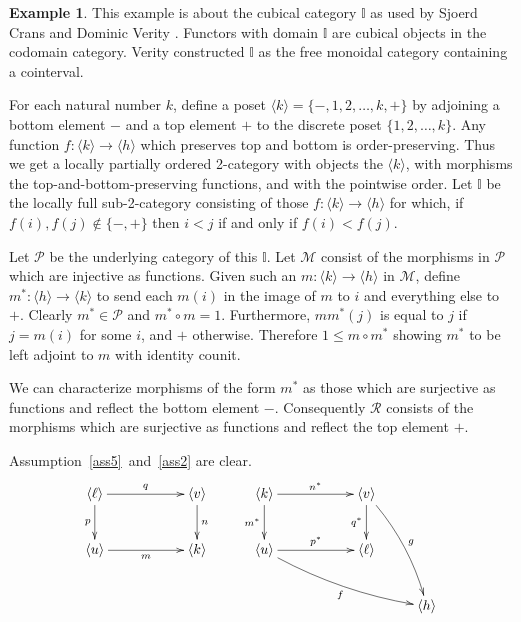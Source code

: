\documentclass[a4paper,12pt,reqno]{amsart}
\theoremstyle{definition}
\newtheorem{example}[theorem]{Example}
\theoremstyle{fact}
\theoremstyle{genquest}
\theoremstyle{step}
\newcommand{\dd}{\colon}
\newcommand{\ra}{\rightarrow}
\def\CM{{\mathscr M}}
\def\CP{{\mathscr P}}
\def\CR{{\mathscr R}}
\begin{document}
\begin{example}\label{Ex3+} This example is about the cubical category $\mathbb{I}$ as used by Sjoerd Crans \cite{CransThesis} and Dominic Verity \cite{LDTHOC, Verity07}. 
Functors with domain $\mathbb{I}$ are cubical objects in the codomain category. 
Verity constructed $\mathbb{I}$ as the free monoidal category containing a cointerval.

For each natural number $k$, define a poset $\langle k\rangle = \{-,1,2,\dots ,k,+\}$ 
by adjoining a bottom element $-$ and a top element $+$ to the discrete poset $\{1,2,\dots ,k\}$.
Any function $f \dd \langle k\rangle \ra \langle h\rangle$ which preserves top and bottom is order-preserving.
Thus we get a locally partially ordered 2-category with objects the $\langle k\rangle$, 
with morphisms the top-and-bottom-preserving functions, and with the pointwise order. 
Let $\mathbb{I}$ be the locally full sub-2-category
consisting of those $f\dd \langle k\rangle \ra \langle h\rangle$ for which,
if $f(i),f(j)\notin \{-,+\}$ then $i<j$ if and only if $f(i)<f(j)$. 

Let $\CP$ be the underlying category of this $\mathbb{I}$.
Let $\CM$ consist of the morphisms in $\CP$ which are injective as functions. 
Given such an $m \dd \langle k\rangle \ra \langle h\rangle$ in $\CM$,
define $m^* : \langle h\rangle \ra \langle k\rangle$ to send each $m(i)$
in the image of $m$ to $i$ and everything else to $+$. 
Clearly $m^*\in \CP$ and $m^*\circ m = 1$.
Furthermore, $mm^*(j)$ is equal to $j$ if $j=m(i)$ for some $i$, and $+$ otherwise.
Therefore $1\le m\circ m^*$ showing $m^*$ to be left adjoint to $m$
with identity counit.

We can characterize morphisms of the form $m^*$ as those which are surjective as functions and reflect the bottom element $-$.
Consequently $\CR$ consists of the morphisms which are surjective as
functions and reflect the top element $+$.

Assumption~\ref{ass5}~and~\ref{ass2} are clear. 
\begin{equation}\label{cubpbpo}
\begin{aligned}
\xymatrix{
\langle \ell \rangle \ar[rr]^-{q} \ar[d]_-{p} &&  \langle v \rangle \ar[d]^-{n} \\
\langle u \rangle \ar[rr]_-{m}  && \langle k \rangle}
\qquad
\xymatrix{
\langle k \rangle \ar[rr]^-{n^*} \ar[d]_-{m^*} && \langle v \rangle \ar[d]_-{q^*} \ar@/^/[ddr]^g \\
\langle u \rangle \ar[rr]^-{p^*} \ar@/_/[drrr]_{f} && \langle \ell \rangle \\
&& & \langle h \rangle }
\end{aligned}
\end{equation}


\end{example}
\end{document}
